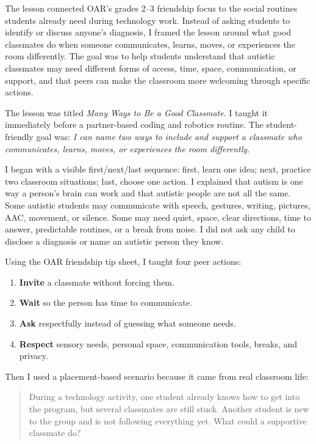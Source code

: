\documentclass[11pt]{article}
\newcommand{\reviewsection}[1]{\vspace{0.08in}\noindent{\normalsize\bfseries\color{PrimaryRed}#1}\par\vspace{0.02in}}
\begin{document}
The lesson connected OAR's grades 2--3 friendship focus to the social routines students already need during technology work. Instead of asking students to identify or discuss anyone's diagnosis, I framed the lesson around what good classmates do when someone communicates, learns, moves, or experiences the room differently. The goal was to help students understand that autistic classmates may need different forms of access, time, space, communication, or support, and that peers can make the classroom more welcoming through specific actions.

\reviewsection{Summary of the 10-Minute Lesson}

The lesson was titled \textit{Many Ways to Be a Good Classmate}. I taught it immediately before a partner-based coding and robotics routine. The student-friendly goal was: \textit{I can name two ways to include and support a classmate who communicates, learns, moves, or experiences the room differently.}

I began with a visible first/next/last sequence: first, learn one idea; next, practice two classroom situations; last, choose one action. I explained that autism is one way a person's brain can work and that autistic people are not all the same. Some autistic students may communicate with speech, gestures, writing, pictures, AAC, movement, or silence. Some may need quiet, space, clear directions, time to answer, predictable routines, or a break from noise. I did not ask any child to disclose a diagnosis or name an autistic person they know.

Using the OAR friendship tip sheet, I taught four peer actions:

\begin{enumerate}
\item \textbf{Invite} a classmate without forcing them.
\item \textbf{Wait} so the person has time to communicate.
\item \textbf{Ask} respectfully instead of guessing what someone needs.
\item \textbf{Respect} sensory needs, personal space, communication tools, breaks, and privacy.
\end{enumerate}

Then I used a placement-based scenario because it came from real classroom life:

\begin{quote}
During a technology activity, one student already knows how to get into the program, but several classmates are still stuck. Another student is new to the group and is not following everything yet. What could a supportive classmate do?
\end{quote}
\end{document}
